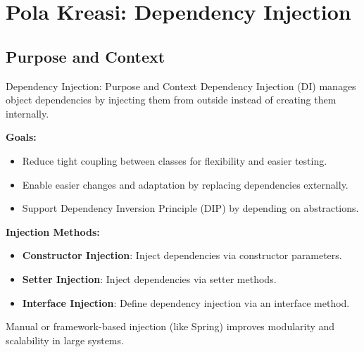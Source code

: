 \documentclass[aspectratio=169, table]{beamer}
\begin{document}
\section{Pola Kreasi: Dependency Injection}

\subsection{Purpose and Context}
\begin{frame}[fragile]{Dependency Injection: Purpose and Context}
	\vspace{20pt}
	Dependency Injection (DI) manages object dependencies by injecting them from outside instead of creating them internally.
	
	\textbf{Goals:}
	\begin{itemize}
		\item Reduce tight coupling between classes for flexibility and easier testing.
		\item Enable easier changes and adaptation by replacing dependencies externally.
		\item Support Dependency Inversion Principle (DIP) by depending on abstractions.
	\end{itemize}
	
	\textbf{Injection Methods:}
	\begin{itemize}
		\item \textbf{Constructor Injection}: Inject dependencies via constructor parameters.
		\item \textbf{Setter Injection}: Inject dependencies via setter methods.
		\item \textbf{Interface Injection}: Define dependency injection via an interface method.
	\end{itemize}
	
	Manual or framework-based injection (like Spring) improves modularity and scalability in large systems.
\end{frame}
\end{document}
